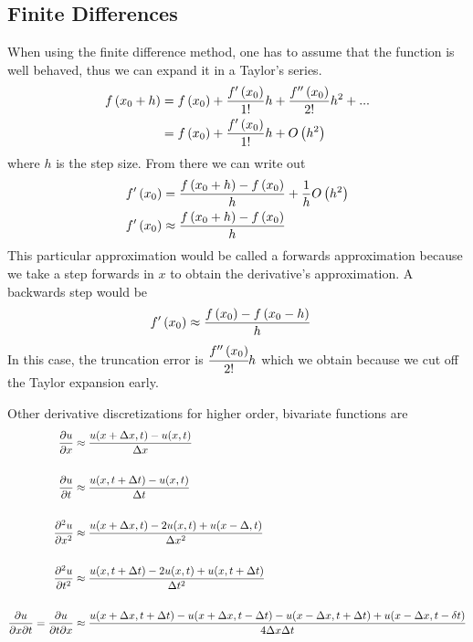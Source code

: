 \subsection{Finite Differences}
When using the finite difference method, one has to assume that the
function is well behaved, thus we can expand it in a Taylor's series.
\begin{align*}
    f\left(x_0+h\right)&= f\left(x_0\right) +\frac{f'\left(x_0\right)}{1!}h +
    \frac{f''\left(x_0\right)}{2!}h^2+ ...\\
    & = f\left(x_0\right) +\frac{f'\left(x_0\right)}{1!}h + O\left(h^2\right)
\end{align*}
where $h$ is the step size. From there we can write out
\begin{align*}
    f'\left(x_0\right)& = \frac{f\left(x_0+h\right)-f\left(x_0\right)}{h} +
    \frac{1}{h}O\left(h^2\right)\\
    f'\left(x_0\right)& \approx \frac{f\left(x_0+h\right)-f\left(x_0\right)}{h}
\end{align*}
This particular approximation would be called a forwards approximation
because we take a step forwards in $x$ to obtain the derivative's
approximation. A backwards step would be
\begin{align*}
    f'\left(x_0\right)& \approx \frac{f\left(x_0\right)-f\left(x_0-h\right)}{h}
\end{align*}
In this case, the truncation error is $\cfrac{f''\left(x_0\right)}{2!}h$
which we obtain because we cut off the Taylor expansion early.

Other derivative discretizations for higher order, bivariate functions
are
\begin{align*}
    \frac{\partial u}{\partial x}&\approx \frac{u(x+\Delta x, t) - u(x, t)}{\Delta x}\\\\
    \frac{\partial u}{\partial t}&\approx \frac{u(x, t+\Delta t) - u(x, t)}{\Delta t}\\\\
    \frac{\partial^2 u}{\partial x^2}&\approx \frac{u(x+\Delta x, t)- 2u(x, t)+ u(x-\Delta,
        t)}{\Delta x^2}\\\\
    \frac{\partial^2 u}{\partial t^2}&\approx \frac{u(x, t+\Delta t)- 2u(x, t)+ u(x,
        t+\Delta t)}{\Delta t^2}\\ \\
    \frac{\partial u}{\partial x\partial t} =   \frac{\partial
        u}{\partial t\partial x}&\approx
    \frac{u(x+\Delta x, t+\Delta t)- u(x+\Delta x, t-\Delta t) -
        u(x-\Delta x, t+\Delta t) + u(x-\Delta x, t-\delta t)}{4\Delta
        x\Delta t}
\end{align*}

